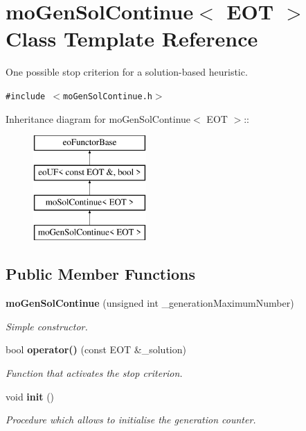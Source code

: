 \section{mo\-Gen\-Sol\-Continue$<$ EOT $>$ Class Template Reference}
\label{classmo_gen_sol_continue}
One possible stop criterion for a solution-based heuristic.  


{\tt \#include $<$mo\-Gen\-Sol\-Continue.h$>$}

Inheritance diagram for mo\-Gen\-Sol\-Continue$<$ EOT $>$::\begin{figure}[H]
\begin{center}
\leavevmode
\includegraphics[height=4cm]{classmo_gen_sol_continue}
\end{center}
\end{figure}
\subsection*{Public Member Functions}
\begin{CompactItemize}
\item 
{\bf mo\-Gen\-Sol\-Continue} (unsigned int \_\-generation\-Maximum\-Number)
\begin{CompactList}\small\item\em Simple constructor. \item\end{CompactList}\item 
bool {\bf operator()} (const EOT \&\_\-solution)
\begin{CompactList}\small\item\em Function that activates the stop criterion. \item\end{CompactList}\item 
void {\bf init} ()
\begin{CompactList}\small\item\em Procedure which allows to initialise the generation counter. \item\end{CompactList}\end{CompactItemize}
